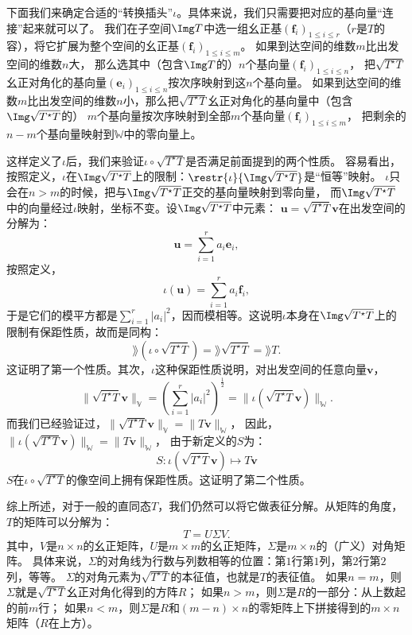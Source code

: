 \documentclass[12pt,UTF8]{ctexbook}
\begin{document}
下面我们来确定合适的“转换插头”$\iota$。具体来说，我们只需要把对应的基向量“连接”起来就可以了。
我们在子空间$\Img T$中选一组幺正基$(\mathbf{f}_i)_{1 \leqslant i \leqslant r}$（$r$是$T$的容），将它扩展为整个空间的幺正基$(\mathbf{f}_i)_{1 \leqslant i \leqslant m}$。
如果到达空间的维数$m$比出发空间的维数$n$大，
那么选其中（包含$\Img T$的）$n$个基向量$(\mathbf{f}_i)_{1 \leqslant i \leqslant n}$，
把$\sqrt{T^\star T}$幺正对角化的基向量$(\mathbf{e}_i)_{1 \leqslant i \leqslant n}$按次序映射到这$n$个基向量。
如果到达空间的维数$m$比出发空间的维数$n$小，那么把$\sqrt{T^\star T}$幺正对角化的基向量中（包含$\Img \sqrt{T^\star T}$的）
$m$个基向量按次序映射到全部$m$个基向量$(\mathbf{f}_i)_{1 \leqslant i \leqslant m}$，
把剩余的$n-m$个基向量映射到$\mathbb{W}$中的零向量上。

这样定义了$\iota$后，我们来验证$\iota \circ \sqrt{T^\star T}$是否满足前面提到的两个性质。
容易看出，按照定义，$\iota$在$\Img \sqrt{T^\star T}$上的限制：$\restr{\iota}{\Img \sqrt{T^\star T}}$是“恒等”映射。
$\iota$只会在$n>m$的时候，把与$\Img \sqrt{T^\star T}$正交的基向量映射到零向量，
而$\Img \sqrt{T^\star T}$中的向量经过$\iota$映射，坐标不变。设$\Img \sqrt{T^\star T}$中元素：
$\mathbf{u} = \sqrt{T^\star T} \mathbf{v}$在出发空间的分解为：
$$ \mathbf{u} = \sum_{i=1}^r a_i \mathbf{e}_i,$$
按照定义，
$$ \iota\left(\mathbf{u}\right) = \sum_{i=1}^r a_i \mathbf{f}_i,$$
于是它们的模平方都是$\sum_{i=1}^r |a_i|^2$，因而模相等。这说明$\iota$本身在$\Img \sqrt{T^\star T}$上的限制有保距性质，故而是同构：
$$\rang \left(\iota\circ\sqrt{T^\star T}\right) = \rang \sqrt{T^\star T} = \rang T.$$
这证明了第一个性质。其次，$\iota$这种保距性质说明，对出发空间的任意向量$\mathbf{v}$，
$$\|\sqrt{T^\star T} \mathbf{v} \|_\mathbb{V} = \left(\sum_{i=1}^r |a_i|^2\right)^{\frac12} = \|\iota\left(\sqrt{T^\star T} \mathbf{v}\right) \|_\mathbb{W}.$$
而我们已经验证过，$\|\sqrt{T^\star T} \mathbf{v} \|_\mathbb{V} = \|T \mathbf{v} \|_\mathbb{W}$，
因此，$\| \iota\left(\sqrt{T^\star T} \mathbf{v}\right) \|_\mathbb{W} = \|T \mathbf{v} \|_\mathbb{W}$，
由于新定义的$S$为：
$$ S : \iota\left(\sqrt{T^\star T} \mathbf{v}\right) \mapsto T \mathbf{v}$$
$S$在$\iota \circ \sqrt{T^\star T}$的像空间上拥有保距性质。这证明了第二个性质。

综上所述，对于一般的直同态$T$，我们仍然可以将它做表征分解。从矩阵的角度，$T$的矩阵可以分解为：
$$ T = U \Sigma V.$$
其中，$V$是$n \times n$的幺正矩阵，$U$是$m \times m$的幺正矩阵，$\Sigma$是$m \times n$的（广义）对角矩阵。
具体来说，$\Sigma$的对角线为行数与列数相等的位置：第$1$行第$1$列，第$2$行第$2$列，等等。
$\Sigma$的对角元素为$\sqrt{T^\star T}$的本征值，也就是$T$的表征值。
如果$n=m$，则$\Sigma$就是$\sqrt{T^\star T}$幺正对角化得到的方阵$R$；
如果$n>m$，则$\Sigma$是$R$的一部分：从上数起的前$m$行；
如果$n<m$，则$\Sigma$是$R$和$(m-n) \times n$的零矩阵上下拼接得到的$m\times n$矩阵（$R$在上方）。
\end{document}
